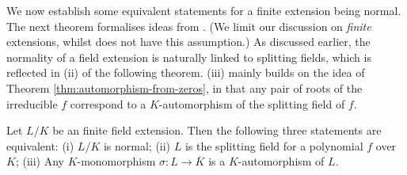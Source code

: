 We now establish some equivalent statements for a finite extension being normal. The next theorem formalises ideas from \cite[Lecture~6]{galois-theory-lectures}. (We limit our discussion on \textit{finite} extensions, whilst \cite{galois-theory-lectures} does not have this assumption.) As discussed earlier, the normality of a field extension is naturally linked to splitting fields, which is reflected in (ii) of the following theorem. (iii) mainly builds on the idea of Theorem \ref{thm:automorphism-from-zeros}, in that any pair of roots of the irreducible $f$ correspond to a $K$-automorphism of the splitting field of $f$. 

\begin{theorem} \label{thm:normal-equiv-def}
    Let $L/K$ be an finite field extension. Then the following three statements are equivalent: (i) $L/K$ is normal; 
    (ii) $L$ is the splitting field for a polynomial $f$ over $K$; 
    (iii) Any $K$-monomorphism $\sigma: L \to \overline K$ is a $K$-automorphism of $L$. 
\end{theorem}

